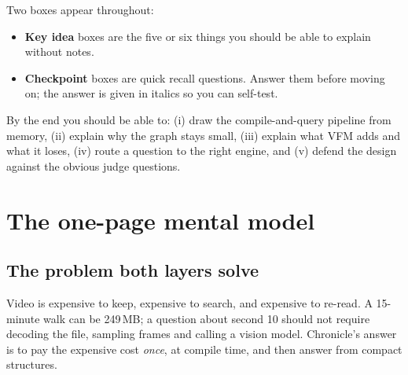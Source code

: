 \documentclass[10pt,a4paper]{article}
\begin{document}
\noindent
Two boxes appear throughout:

\begin{itemize}[leftmargin=1.2em,itemsep=1pt]
  \item \textbf{Key idea} boxes are the five or six things you should be able to explain without notes.
  \item \textbf{Checkpoint} boxes are quick recall questions. Answer them before moving on; the
        answer is given in italics so you can self-test.
\end{itemize}

\noindent
By the end you should be able to: (i) draw the compile-and-query pipeline from memory, (ii) explain
why the graph stays small, (iii) explain what VFM adds and what it loses, (iv) route a question to
the right engine, and (v) defend the design against the obvious judge questions.

\section{The one-page mental model}

\subsection*{The problem both layers solve}

Video is expensive to keep, expensive to search, and expensive to re-read. A 15-minute walk can be
249\,MB; a question about second 10 should not require decoding the file, sampling frames and calling
a vision model. Chronicle's answer is to pay the expensive cost \emph{once}, at compile time, and
then answer from compact structures.
\end{document}
